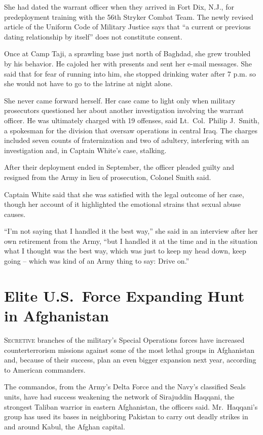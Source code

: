 ﻿\documentclass[12pt]{article}
\begin{document}
She had dated the warrant officer when they arrived in Fort Dix, N.J., for predeployment training
with the 56th Stryker Combat Team. The newly revised article of the Uniform Code of Military Justice
says that ``a current or previous dating relationship by itself'' does not constitute consent.

Once at Camp Taji, a sprawling base just north of Baghdad, she grew troubled by his behavior. He
cajoled her with presents and sent her e-mail messages. She said that for fear of running into him,
she stopped drinking water after 7 p.m. so she would not have to go to the latrine at night alone.

She never came forward herself. Her case came to light only when military prosecutors questioned her
about another investigation involving the warrant officer. He was ultimately charged with 19
offenses, said Lt.~Col.~Philip J.~Smith, a spokesman for the division that oversaw operations in
central Iraq. The charges included seven counts of fraternization and two of adultery, interfering
with an investigation and, in Captain White's case, stalking.

After their deployment ended in September, the officer pleaded guilty and resigned from the Army in
lieu of prosecution, Colonel Smith said.

Captain White said that she was satisfied with the legal outcome of her case, though her account of
it highlighted the emotional strains that sexual abuse causes.

``I'm not saying that I handled it the best way,'' she said in an interview after her own retirement
from the Army, ``but I handled it at the time and in the situation what I thought was the best way,
which was just to keep my head down, keep going -- which was kind of an Army thing to say: Drive
on.''

\section{Elite U.S.~Force Expanding Hunt in Afghanistan}

\lettrine{S}{ecretive} branches of the military's Special Operations forces
have increased counterterrorism missions against some of the most lethal groups in Afghanistan and,
because of their success, plan an even bigger expansion next year, according to American commanders.

The commandos, from the Army's Delta Force and the Navy's classified Seals units, have had success
weakening the network of Sirajuddin Haqqani, the strongest Taliban warrior in eastern Afghanistan,
the officers said. Mr.~Haqqani's group has used its bases in neighboring Pakistan to carry out
deadly strikes in and around Kabul, the Afghan capital.
\end{document}

